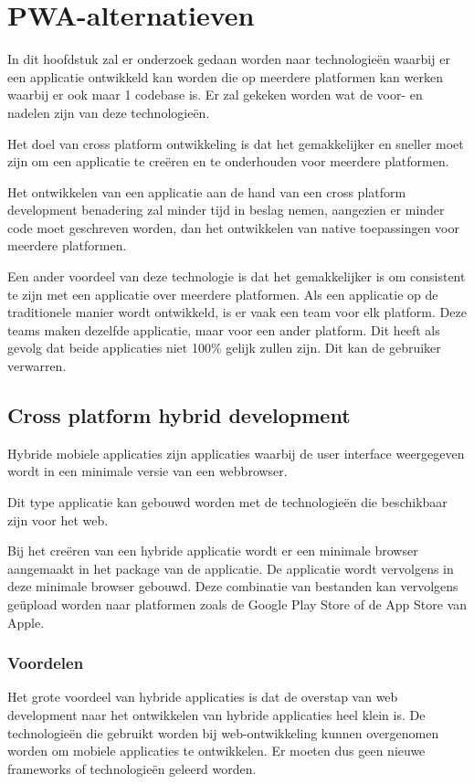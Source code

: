 \clearpage
\section{PWA-alternatieven}
\label{ch:pwaAlternatieven}

In dit hoofdstuk zal er onderzoek gedaan worden naar technologieën waarbij er een applicatie ontwikkeld kan worden die op meerdere platformen kan werken waarbij er ook maar 1 codebase is. Er zal gekeken worden wat de voor- en nadelen zijn van deze technologieën. 

Het doel van cross platform ontwikkeling is dat het gemakkelijker en sneller moet zijn om een applicatie te creëren en te onderhouden voor meerdere platformen.

Het ontwikkelen van een applicatie aan de hand van een cross platform development benadering zal minder tijd in beslag nemen, aangezien er minder code moet geschreven worden, dan het ontwikkelen van native toepassingen voor meerdere platformen. 

Een ander voordeel van deze technologie is dat het gemakkelijker is om consistent te zijn met een applicatie over meerdere platformen. Als een applicatie op de traditionele manier wordt ontwikkeld, is er vaak een team voor elk platform. Deze teams maken dezelfde applicatie, maar voor een ander platform. Dit heeft als gevolg dat beide applicaties niet 100\% gelijk zullen zijn. Dit kan de gebruiker verwarren.


\subsection{Cross platform hybrid development}

	Hybride mobiele applicaties zijn applicaties waarbij de user interface weergegeven wordt in een minimale versie van een webbrowser.
		
	Dit type applicatie kan gebouwd worden met de technologieën die beschikbaar zijn voor het web.
	
	Bij het creëren van een hybride applicatie wordt er een minimale browser aangemaakt in het package van de applicatie. De applicatie wordt vervolgens in deze minimale browser gebouwd. Deze combinatie van bestanden kan vervolgens geüpload worden naar platformen zoals de Google Play Store of de App Store van Apple.
	\autocite{Huynh2017}
	
	
	\subsubsection{Voordelen}
		Het grote voordeel van hybride applicaties is dat de overstap van web development naar het ontwikkelen van hybride applicaties heel klein is. De technologieën die gebruikt worden bij web-ontwikkeling kunnen overgenomen worden om mobiele applicaties te ontwikkelen. Er moeten dus geen nieuwe frameworks of technologieën geleerd worden.
		
